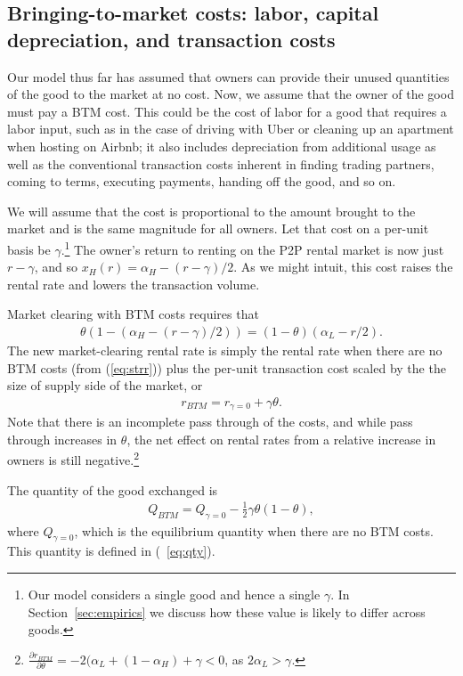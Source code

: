 \documentclass[11pt]{article}
\begin{document}
\subsection{Bringing-to-market costs: labor, capital depreciation, and transaction costs}

Our model thus far has assumed that owners can provide their unused quantities of the good to the market at no cost. 
Now, we assume that the owner of the good must pay a BTM cost. 
This could be the cost of labor for a good that requires a labor input, such as in the case of driving with Uber or cleaning up an apartment when hosting on Airbnb;
it also includes depreciation from additional usage as well as the conventional transaction costs inherent in finding trading partners, coming to terms, executing payments, handing off the good, and so on.  

We will assume that the cost is proportional to the amount brought to the market and is the same magnitude for all owners.
Let that cost on a per-unit basis be $\gamma$.\footnote{
  Our model considers a single good and hence a single $\gamma$.
  In Section~\ref{sec:empirics} we discuss how these value is likely to differ across goods. 
  }
The owner's return to renting on the P2P rental market is now just $r - \gamma$, and so $x_H(r) = \alpha_H - (r - \gamma)/2$.
As we might intuit, this cost raises the rental rate and lowers the transaction volume. 

Market clearing with BTM costs requires that 
\begin{align}
  \theta (1 - (\alpha_H - (r-\gamma)/2)) = (1-\theta)(\alpha_L - r/2).
\end{align}
The new market-clearing rental rate is simply the rental rate when there are no BTM costs (from (\ref{eq:strr})) plus the per-unit transaction cost scaled by the the size of supply side of the market, or  
\begin{align} \label{eq:rental_rate_sr_bmc}
  r_{BTM} = r_{\gamma = 0} + \gamma \theta. 
\end{align}
Note that there is an incomplete pass through of the costs, and while pass through increases in $\theta$, the net effect on rental rates from a relative increase in owners is still negative.\footnote{
  $\frac{\partial r_{BTM}}{\partial \theta} = -2(\alpha_L + (1-\alpha_H) + \gamma < 0$, as $2\alpha_L > \gamma$.}

The quantity of the good exchanged is
\begin{align} \label{eq:qty_gamma}
  Q_{BTM} = Q_{\gamma = 0} - \frac{1}{2} \gamma \theta (1-\theta),
\end{align} 
where $Q_{\gamma = 0}$, which is the equilibrium quantity when there are no BTM costs.
This quantity is defined in (~\ref{eq:qty}). 
\end{document}
